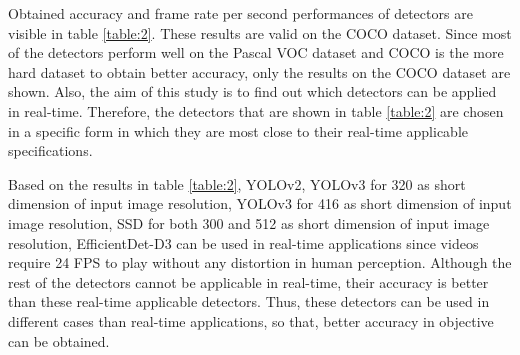 \documentclass{article}
\begin{document}
\setlength{\parindent}{6ex}

\indent

Obtained accuracy and frame rate per second performances of detectors are visible 
in table \ref{table:2}. These results are valid on the COCO dataset. 
Since most of the detectors perform well on the Pascal VOC dataset and COCO is the more hard 
dataset to obtain better accuracy, only the results on the COCO dataset are shown. Also, 
the aim of this study is to find out which detectors can be applied in real-time. 
Therefore, the detectors that are shown in table \ref{table:2} 
are chosen in a specific form in which they are most close to their real-time 
applicable specifications. \par

Based on the results in table \ref{table:2}, YOLOv2, YOLOv3 for 320 as short dimension of input 
image resolution, YOLOv3 for 416 as short dimension of input image resolution, SSD for both 300 
and 512 as short dimension of input image resolution, EfficientDet-D3 can be used in real-time 
applications since videos require 24 FPS to play without any distortion in human perception. 
Although the rest of the detectors cannot be applicable in real-time, their accuracy is better 
than these real-time applicable detectors. Thus, these detectors can be used in 
different cases than real-time applications, so that, better accuracy in objective 
can be obtained.
\end{document}
